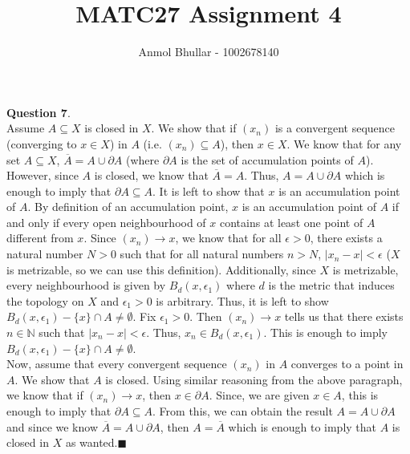 \documentclass{article}
\title{MATC27 Assignment 4}
\author{Anmol Bhullar - 1002678140}
\begin{document}
    \textbf{Question 7}.\\
    Assume $A\subseteq X$ is closed in $X$. We show that if $(x_n)$ is a convergent sequence (converging to $x\in X$) in $A$ (i.e. $(x_n)\subseteq A$), 
    then $x\in X$. We know that for any set $A\subseteq X$, $\overline{A} = A \cup \partial{A}$ (where $\partial{A}$ is the set of accumulation points of $A$).
    However, since $A$ is closed, we know that $\overline{A} = A$. Thus, $A = A \cup \partial{A}$ which is enough to imply that $\partial{A} \subseteq A$.
    It is left to show that $x$ is an accumulation point of $A$. By definition of an accumulation point, $x$ is an accumulation point of $A$ if and only if
    every open neighbourhood of $x$ contains at least one point of $A$ different from $x$. Since $(x_n)\to x$, we know that for all $\epsilon>0$, there exists a
    natural number $N > 0$ such that for all natural numbers $n > N$, $|x_n - x| < \epsilon$ ($X$ is metrizable, so we can use this definition). Additionally,
    since $X$ is metrizable, every neighbourhood is given by $B_d(x,\epsilon_1)$ where $d$ is the metric that induces the topology on $X$ and $\epsilon_1>0$ is arbitrary.
    Thus, it is left to show $B_d(x,\epsilon_1) - \{x\} \cap A \neq \emptyset$. Fix $\epsilon_1 > 0$. Then $(x_n)\to x$ tells us that there exists $n\in\mathbb{N}$
    such that $|x_n - x| < \epsilon$. Thus, $x_n \in B_d(x,\epsilon_1)$. This is enough to imply $B_d(x,\epsilon_1) - \{x\} \cap A \neq \emptyset$.\\
    
    Now, assume that every convergent sequence $(x_n)$ in $A$ converges to a point in $A$. We show that $A$ is closed. Using similar reasoning from the above paragraph,
    we know that if $(x_n)\to x$, then $x\in\partial{A}$. Since, we are given $x\in A$, this is enough to imply that $\partial{A}\subseteq A$. From this, we can
    obtain the result $A = A \cup \partial{A}$ and since we know $\overline{A} = A \cup \partial{A}$, then $A = \overline{A}$ which is enough to imply that $A$ is
    closed in $X$ as wanted.\hfill$\blacksquare$
\end{document}
